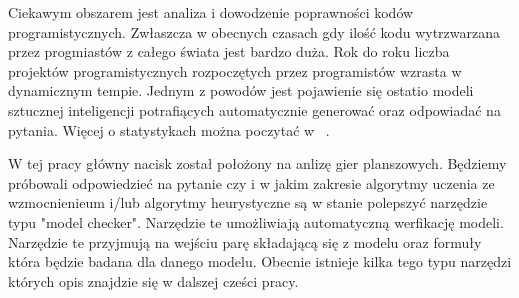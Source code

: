 Ciekawym obszarem jest analiza i dowodzenie poprawności kodów programistycznych. Zwłaszcza w obecnych czasach
gdy ilość kodu wytrzwarzana przez progmiastów z całego świata jest bardzo duża. Rok do roku liczba projektów programistycznych
rozpoczętych przez programistów wzrasta w dynamicznym tempie. Jednym z powodów jest pojawienie się ostatio
 modeli sztucznej inteligencji potrafiących
automatycznie generować oraz odpowiadać na pytania. Więcej o statystykach można poczytać w  ~\cite{Github}.

W tej pracy główny nacisk został położony na anlizę gier planszowych. Będziemy próbowali odpowiedzieć 
na pytanie czy i w jakim zakresie algorytmy uczenia ze wzmocnienieum i/lub algorytmy heurystyczne są w stanie 
polepszyć narzędzie typu "model checker". Narzędzie te umożliwiają automatyczną werfikację modeli.
Narzędzie te przyjmują na wejściu parę składającą się z modelu oraz formuły która będzie badana dla danego modelu.
Obecnie istnieje kilka tego typu narzędzi których opis znajdzie się w dalszej cześci pracy.


